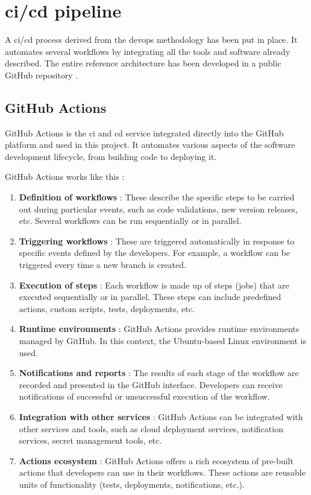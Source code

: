 \section{\texorpdfstring{\acrshort{ci}/\acrshort{cd}}{} pipeline}
A \acrshort{ci}/\acrshort{cd} process derived from the \acrshort{devops} methodology has been put in place. It automates several workflows by integrating all the tools and software already described. The entire reference architecture has been developed in a public GitHub repository \cite{aws_iot_reference_architecture}.

\subsection{GitHub Actions}
GitHub Actions is the \acrfull{ci} and \acrfull{cd} service integrated directly into the GitHub platform and used in this project. It automates various aspects of the software development lifecycle, from building code to deploying it.

GitHub Actions works like this :
\begin{enumerate}
    \item \textbf{Definition of workflows} : These describe the specific steps to be carried out during particular events, such as code validations, new version releases, etc. Several workflows can be run sequentially or in parallel.
    \item \textbf{Triggering workflows} : These are triggered automatically in response to specific events defined by the developers. For example, a workflow can be triggered every time a new branch is created.
    \item \textbf{Execution of steps} : Each workflow is made up of steps (jobs) that are executed sequentially or in parallel. These steps can include predefined actions, custom scripts, tests, deployments, etc.
    \item \textbf{Runtime environments} : GitHub Actions provides runtime environments managed by GitHub. In this context, the Ubuntu-based Linux environment is used.
    \item \textbf{Notifications and reports} : The results of each stage of the workflow are recorded and presented in the GitHub interface. Developers can receive notifications of successful or unsuccessful execution of the workflow.
    \item \textbf{Integration with other services} : GitHub Actions can be integrated with other services and tools, such as \gls{cloud} deployment services, notification services, secret management tools, etc.
    \item \textbf{Actions ecosystem} : GitHub Actions offers a rich ecosystem of pre-built actions that developers can use in their workflows. These actions are reusable units of functionality (tests, deployments, notifications, etc.).
\end{enumerate}

